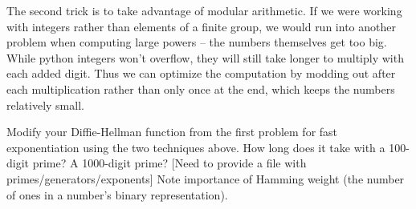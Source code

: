 The second trick is to take advantage of modular arithmetic. If we were working with integers rather than elements of a finite group, we would run into another problem when computing large powers -- the numbers themselves get too big. While python integers won't overflow, they will still take longer to multiply with each added digit. Thus we can optimize the computation by modding out after each multiplication rather than only once at the end, which keeps the numbers relatively small.

\begin{problem}
Modify your Diffie-Hellman function from the first problem for fast exponentiation using the two techniques above. How long does it take with a 100-digit prime? A 1000-digit prime? [Need to provide a file with primes/generators/exponents] Note importance of Hamming weight (the number of ones in a number's binary representation).
\end{problem}



